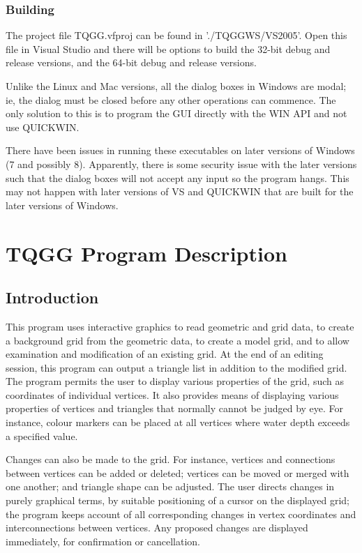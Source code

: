 \documentclass{article}
\begin{document}
\subsubsection{Building}
The project file TQGG.vfproj can be found in './TQGGWS/VS2005'. Open this file in Visual Studio
and there will be options to build the 32-bit debug and release versions, and the 64-bit debug 
and release versions.

Unlike the Linux and Mac versions, all the dialog boxes in Windows are modal; ie, the dialog must be 
closed before any other operations can commence. The only solution to this is to program the GUI
directly with the WIN API and not use QUICKWIN.

There have been issues in running these executables on later versions of Windows (7 and possibly 8).
Apparently, there is some security issue with the later versions such that the dialog boxes will
not accept any input so the program hangs. This may not happen with later versions of VS and QUICKWIN that
are built for the later versions of Windows.




\newpage
\section{TQGG Program Description}

\label{bkm:Ref406485171}\label{bkm:Ref406484745}\subsection{Introduction}
This program uses interactive graphics to read geometric and grid data, to create a background grid from the geometric data, to create a model grid, and to allow examination and modification of an existing grid. At the end of an editing session, this program can output a triangle list in addition to the modified grid. The program permits the user to display various properties of the grid, such as coordinates of individual vertices. It also provides means of displaying various properties of vertices and triangles that normally cannot be judged by eye. For instance, colour markers can be placed at all vertices where water depth exceeds a specified value.

Changes can also be made to the grid. For instance, vertices and connections between vertices can be added or deleted; vertices can be moved or merged with one another; and triangle shape can be adjusted. The user directs changes in purely graphical terms, by suitable positioning of a cursor on the displayed grid; the program keeps account of all corresponding changes in vertex coordinates and interconnections between vertices. Any proposed changes are displayed immediately, for confirmation or cancellation.
\end{document}
